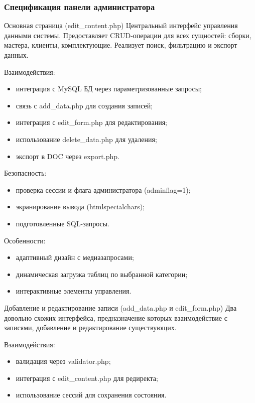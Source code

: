 \newpage
\subsubsection{Спецификация панели администратора}
Основная страница (edit\_content.php)
Центральный интерфейс управления данными системы. Предоставляет CRUD-операции для всех сущностей: сборки, мастера, клиенты, комплектующие. Реализует поиск, фильтрацию и экспорт данных.

Взаимодействия:
\begin{itemize}
	\item интеграция с MySQL БД через параметризованные запросы;
	\item связь с add\_data.php для создания записей;
	\item интеграция с edit\_form.php для редактирования;
	\item использование delete\_data.php для удаления;
	\item экспорт в DOC через export.php.
\end{itemize}

Безопасность:
\begin{itemize}
	\item проверка сессии и флага администратора (adminflag=1);
	\item экранирование вывода (htmlspecialchars);
	\item подготовленные SQL-запросы.
\end{itemize}

Особенности:
\begin{itemize}
	\item адаптивный дизайн с медиазапросами;
	\item динамическая загрузка таблиц по выбранной категории;
	\item интерактивные элементы управления.
\end{itemize}

Добавление и редактирование записи (add\_data.php и edit\_form.php)
Два довольно схожих интерфейса, предназначение которых взаимодействие с записями, добавление и редактирование существующих. 

Взаимодействия:
\begin{itemize}
	\item валидация через validator.php;
	\item интеграция с edit\_content.php для редиректа;
	\item использование сессий для сохранения состояния.
\end{itemize}

